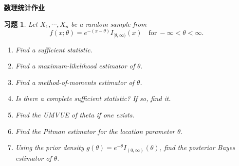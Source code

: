\documentclass[a4paper,oneside,12pt]{ctexart}
\theoremstyle{plain}
\newtheorem{exercise}{习题}
\theoremstyle{nonumberplain}
\theoremstyle{nonumberplain}
\begin{document}
    \begin{center}
        \LARGE\bfseries
        数理统计作业
    \end{center}

    \begin{exercise}
        \label{ex:44}
        Let $X_1,\cdots,X_n$ be a random sample from 
        \begin{equation*}
            f(x;\theta)=e^{-(x-\theta)}I_{[\theta,\infty)}(x) \quad \text{for}\ -\infty<\theta<\infty.
        \end{equation*}

        \begin{enumerate}[($a$)]
            \item Find a sufficient statistic.
            \item Find a maximum-likelihood estimator of $\theta$.
            \item Find a method-of-moments estimator of $\theta$.   
            \item Is there a complete sufficient statistic? If so, find it.
            \item Find the UMVUE of theta if one exists.
            \item Find the Pitman estimator for the location parameter $\theta$.
            \item Using the prior density $g(\theta)=e^{-\theta}I_{(0,\infty)}(\theta)$, find the posterior Bayes estimator of $\theta$.
        \end{enumerate}
    \end{exercise}
\end{document}
